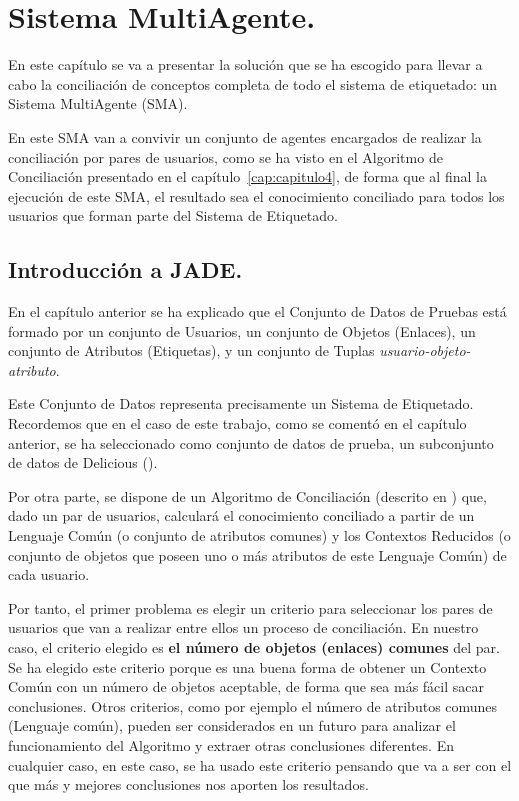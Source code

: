 \chapter{Sistema MultiAgente.}\label{cap:capitulo6}
En este capítulo se va a presentar la solución que se ha escogido para llevar a cabo la conciliación de conceptos completa de todo el sistema de etiquetado: un Sistema MultiAgente (SMA).

En este SMA van a convivir un conjunto de agentes encargados de realizar la conciliación por pares de usuarios, como se ha visto en el Algoritmo de Conciliación presentado en el capítulo~\ref{cap:capitulo4}, de forma que al final la ejecución de este SMA, el resultado sea el conocimiento conciliado para todos los usuarios que forman parte del Sistema de Etiquetado.





\section{Introducción a JADE.}

En el capítulo anterior se ha explicado que el Conjunto de Datos de Pruebas está formado por un conjunto de Usuarios, un conjunto de Objetos (Enlaces), un conjunto de Atributos (Etiquetas), y un conjunto de Tuplas \emph{usuario-objeto-atributo}.

Este Conjunto de Datos representa precisamente un Sistema de Etiquetado. Recordemos que en el  caso de este trabajo, como se comentó en el capítulo anterior, se ha seleccionado como conjunto de datos de prueba, un subconjunto de datos de Delicious (\cite{delicious}).

Por otra parte, se dispone de un Algoritmo de Conciliación (descrito en \cite{algoritmo}) que, dado un par de usuarios, calculará el conocimiento conciliado a partir de un Lenguaje Común (o conjunto de atributos comunes) y los Contextos Reducidos (o conjunto de objetos que poseen uno o más atributos de este Lenguaje Común) de cada usuario.

Por tanto, el primer problema es elegir un criterio para seleccionar los pares de usuarios que van a realizar entre ellos un proceso de conciliación. En nuestro caso, el criterio elegido es {\bf el número de objetos (enlaces) comunes} del par. Se ha elegido este criterio porque es una buena forma de obtener un Contexto Común con un número de objetos aceptable, de forma que sea más fácil sacar conclusiones. Otros criterios, como por ejemplo el número de atributos comunes (Lenguaje común), pueden ser considerados en un futuro para analizar el funcionamiento del Algoritmo y extraer otras conclusiones diferentes. En cualquier caso, en este caso, se ha usado este criterio pensando que va a ser con el que más y mejores conclusiones nos aporten los resultados.

